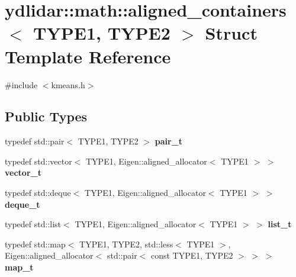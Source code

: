 \hypertarget{structydlidar_1_1math_1_1aligned__containers}{}\section{ydlidar\+:\+:math\+:\+:aligned\+\_\+containers$<$ T\+Y\+P\+E1, T\+Y\+P\+E2 $>$ Struct Template Reference}
\label{structydlidar_1_1math_1_1aligned__containers}


{\ttfamily \#include $<$kmeans.\+h$>$}

\subsection*{Public Types}
\begin{DoxyCompactItemize}
\item 
typedef std\+::pair$<$ T\+Y\+P\+E1, T\+Y\+P\+E2 $>$ {\bfseries pair\+\_\+t}\hypertarget{structydlidar_1_1math_1_1aligned__containers_aef4fb79137cd55476ba34110fbdd6dbb}{}\label{structydlidar_1_1math_1_1aligned__containers_aef4fb79137cd55476ba34110fbdd6dbb}

\item 
typedef std\+::vector$<$ T\+Y\+P\+E1, Eigen\+::aligned\+\_\+allocator$<$ T\+Y\+P\+E1 $>$ $>$ {\bfseries vector\+\_\+t}\hypertarget{structydlidar_1_1math_1_1aligned__containers_a7829b440f024e7e7fc04701fbdf8717e}{}\label{structydlidar_1_1math_1_1aligned__containers_a7829b440f024e7e7fc04701fbdf8717e}

\item 
typedef std\+::deque$<$ T\+Y\+P\+E1, Eigen\+::aligned\+\_\+allocator$<$ T\+Y\+P\+E1 $>$ $>$ {\bfseries deque\+\_\+t}\hypertarget{structydlidar_1_1math_1_1aligned__containers_a7b0c8692304b7c0fdf240e0f12dad884}{}\label{structydlidar_1_1math_1_1aligned__containers_a7b0c8692304b7c0fdf240e0f12dad884}

\item 
typedef std\+::list$<$ T\+Y\+P\+E1, Eigen\+::aligned\+\_\+allocator$<$ T\+Y\+P\+E1 $>$ $>$ {\bfseries list\+\_\+t}\hypertarget{structydlidar_1_1math_1_1aligned__containers_ac44d039f65074789a31dff58c3524fcd}{}\label{structydlidar_1_1math_1_1aligned__containers_ac44d039f65074789a31dff58c3524fcd}

\item 
typedef std\+::map$<$ T\+Y\+P\+E1, T\+Y\+P\+E2, std\+::less$<$ T\+Y\+P\+E1 $>$, Eigen\+::aligned\+\_\+allocator$<$ std\+::pair$<$ const T\+Y\+P\+E1, T\+Y\+P\+E2 $>$ $>$ $>$ {\bfseries map\+\_\+t}\hypertarget{structydlidar_1_1math_1_1aligned__containers_a976b6317e5cf1543320994c2c063aa5c}{}\label{structydlidar_1_1math_1_1aligned__containers_a976b6317e5cf1543320994c2c063aa5c}


\end{DoxyCompactItemize}
